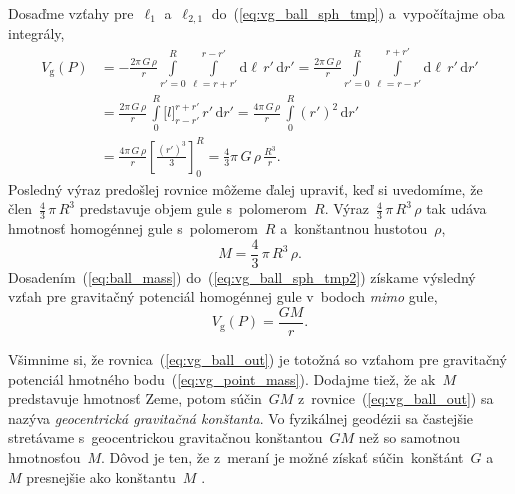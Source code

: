 \documentclass[a4paper, 12pt]{book}
\newcommand{\diff}{\mathrm d}
\newcommand{\gidx}{\mathrm g}
\begin{document}
Dosaďme vzťahy pre~$\ell_1$ a~$\ell_{2,1}$ do~(\ref{eq:vg_ball_sph_tmp}) 
a~vypočítajme oba integrály,
%
\begin{equation}
\label{eq:vg_ball_sph_tmp2}
\begin{split}
V_\gidx(P) &= -\frac{2\pi \, G \, \rho}{r} \int\limits_{r' = 0}^R 
\int\limits_{\ell = r + r'}^{r - r'} \diff \ell \, r' \, \diff r'
%
= \frac{2\pi \, G \, \rho}{r} \int\limits_{r' = 0}^R \int\limits_{\ell 
= r - r'}^{r + r'} \diff \ell \, r' \, \diff r'\\
%
&= \frac{2\pi \, G \, \rho}{r} \,  \int\limits_{0}^R \big[ l \big]_{r - r'}^{r 
+ r'} \, r'  \, \diff r'
%
= \frac{4\pi \, G \, \rho}{r} \, \int\limits_{0}^R (r')^2 \, \diff r'\\
%
&=  \frac{4\pi \, G \, \rho}{r} \left[ \frac{(r')^3}{3} \right]_{0}^{R} 
= \frac{4}{3}\pi \, G \, \rho \, \frac{R^3}{r}{.}
\end{split}
\end{equation}
%
Posledný výraz predošlej rovnice môžeme ďalej upraviť, keď si uvedomíme, že 
člen~$\frac{4}{3} \, \pi \, R^3$ predstavuje objem gule s~polomerom~$R$.  
Výraz~$\frac{4}{3} \, \pi \, R^3 \, \rho$ tak udáva hmotnosť homogénnej gule 
s~polomerom~$R$ a~konštantnou hustotou~$\rho$,
%
\begin{equation}
\label{eq:ball_mass}
M = \frac{4}{3} \, \pi \, R^3 \, \rho{.}
\end{equation}
%
Dosadením~(\ref{eq:ball_mass}) do~(\ref{eq:vg_ball_sph_tmp2}) získame výsledný 
vzťah pre gravitačný potenciál homogénnej gule v~bodoch \emph{mimo} gule,
%
\begin{equation}
\label{eq:vg_ball_out}
V_\gidx(P) = \frac{GM}{r}{.}
\end{equation}

Všimnime si, že rovnica~(\ref{eq:vg_ball_out}) je totožná so vzťahom pre 
gravitačný potenciál hmotného bodu~(\ref{eq:vg_point_mass}).  Dodajme tiež, že 
ak~$M$ predstavuje hmotnosť Zeme, potom súčin~$GM$ 
z~rovnice~(\ref{eq:vg_ball_out}) sa nazýva \emph{geocentrická gravitačná 
konštanta}.  Vo fyzikálnej geodézii sa častejšie stretávame s~geocentrickou 
gravitačnou konštantou~$GM$ než so samotnou hmotnosťou~$M$.  Dôvod je ten, že 
z~meraní je možné získať súčin~konštánt~$G$ a~$M$ presnejšie ako konštantu~$M$ 
\parencite{Pick2000}.
\end{document}
